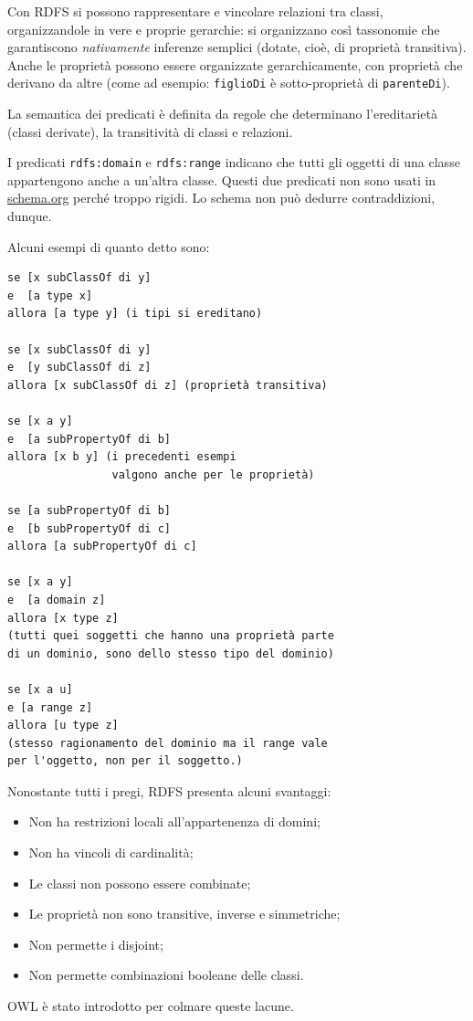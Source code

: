 \documentclass[11pt]{article}
\begin{document}
Con RDFS si possono rappresentare e vincolare relazioni tra classi, organizzandole in vere e proprie gerarchie: si organizzano così tassonomie che garantiscono \textit{nativamente} inferenze semplici (dotate, cioè, di proprietà transitiva).
Anche le proprietà possono essere organizzate gerarchicamente, con proprietà che derivano da altre (come ad esempio: \verb|figlioDi| è sotto-proprietà di \verb|parenteDi|).

La semantica dei predicati è definita da regole che determinano l'ereditarietà (classi derivate), la transitività di classi e relazioni.

I predicati \verb|rdfs:domain| e \verb|rdfs:range| indicano che tutti gli oggetti di una classe appartengono anche a un'altra classe.
Questi due predicati non sono usati in \url{schema.org} perché troppo rigidi. Lo schema non può dedurre contraddizioni, dunque.

Alcuni esempi di quanto detto sono:
\begin{verbatim}
se [x subClassOf di y] 		
e  [a type x]				 
allora [a type y] (i tipi si ereditano)

se [x subClassOf di y]
e  [y subClassOf di z]
allora [x subClassOf di z] (proprietà transitiva)

se [x a y]
e  [a subPropertyOf di b]
allora [x b y] (i precedenti esempi 
                valgono anche per le proprietà)
                
se [a subPropertyOf di b]
e  [b subPropertyOf di c]
allora [a subPropertyOf di c]

se [x a y]
e  [a domain z]
allora [x type z]
(tutti quei soggetti che hanno una proprietà parte 
di un dominio, sono dello stesso tipo del dominio) 
                   
se [x a u]
e [a range z]
allora [u type z] 
(stesso ragionamento del dominio ma il range vale 
per l'oggetto, non per il soggetto.)                
\end{verbatim}

Nonostante tutti i pregi, RDFS presenta alcuni svantaggi:
\begin{itemize}
\item Non ha restrizioni locali all'appartenenza di domini;
\item Non ha vincoli di cardinalità;
\item Le classi non possono essere combinate;
\item Le proprietà non sono transitive, inverse e simmetriche;
\item Non permette i disjoint;
\item Non permette combinazioni booleane delle classi.
\end{itemize}
OWL è stato introdotto per colmare queste lacune.
\end{document}
